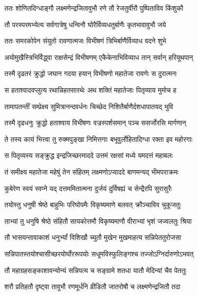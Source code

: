 \twolineshloka
{ततः शोणितदिग्धाङ्गौ लक्ष्मणेन्द्रजितावुभौ}
{रणे तौ रेजतुर्वीरौ पुष्पिताविव किंशुकौ} %

\twolineshloka
{तौ परस्परमभ्येत्य सर्वगात्रेषु धन्विनौ}
{घोरैर्विव्यधतुर्बाणैः कृतभावावुभौ जये} %

\twolineshloka
{ततः समरकोपेन संयुतो रावणात्मजः}
{विभीषणं त्रिभिर्बाणैर्विव्याध वदने शुभे} %

\twolineshloka
{अयोमुखैस्त्रिभिर्विद्ध्वा राक्षसेन्द्रं विभीषणम्}
{एकैकेनाभिविव्याध तान् सर्वान् हरियूथपान्} %

\twolineshloka
{तस्मै दृढतरं क्रुद्धो जघान गदया हयान्}
{विभीषणो महातेजा रावणेः स दुरात्मनः} %

\twolineshloka
{स हताश्वादवप्लुत्य रथान्निहतसारथेः}
{अथ शक्तिं महातेजाः पितृव्याय मुमोच ह} %

\twolineshloka
{तामापतन्तीं सम्प्रेक्ष्य सुमित्रानन्दवर्धनः}
{चिच्छेद निशितैर्बाणैर्दशधापातयद् भुवि} %

\twolineshloka
{तस्मै दृढधनुः क्रुद्धो हताश्वाय विभीषणः}
{वज्रस्पर्शसमान् पञ्च ससर्जोरसि मार्गणान्} %

\twolineshloka
{ते तस्य कायं भित्त्वा तु रुक्मपुङ्खा निमित्तगाः}
{बभूवुर्लोहितादिग्धा रक्ता इव महोरगाः} %

\twolineshloka
{स पितृव्यस्य सङ्क्रुद्ध इन्द्रजिच्छरमाददे}
{उत्तमं रक्षसां मध्ये यमदत्तं महाबलः} %

\twolineshloka
{तं समीक्ष्य महातेजा महेषुं तेन संहितम्}
{लक्ष्मणोऽप्याददे बाणमन्यद् भीमपराक्रमः} %

\twolineshloka
{कुबेरेण स्वयं स्वप्ने यद् दत्तममितात्मना}
{दुर्जयं दुर्विषह्यं च सेन्द्रैरपि सुरासुरैः} %

\twolineshloka
{तयोस्तु धनुषी श्रेष्ठे बाहुभिः परिघोपमैः}
{विकृष्यमाणे बलवत् क्रौञ्चाविव चुकूजतुः} %

\twolineshloka
{ताभ्यां तु धनुषि श्रेष्ठे संहितौ सायकोत्तमौ}
{विकृष्यमाणौ वीराभ्यां भृशं जज्वलतुः श्रिया} %

\twolineshloka
{तौ भासयन्तावाकाशं धनुर्भ्यां विशिखौ च्युतौ}
{मुखेन मुखमाहत्य सन्निपेततुरोजसा} %

\twolineshloka
{सन्निपातस्तयोश्चासीच्छरयोर्घोररूपयोः}
{सधूमविस्फुलिङ्गश्च तज्जोऽग्निर्दारुणोऽभवत्} %

\twolineshloka
{तौ महाग्रहसङ्काशावन्योन्यं सन्निपत्य च}
{सङ्ग्रामे शतधा यातौ मेदिन्यां चैव पेततुः} %

\twolineshloka
{शरौ प्रतिहतौ दृष्ट्वा तावुभौ रणमूर्धनि}
{व्रीडितौ जातरोषौ च लक्ष्मणेन्द्रजितौ तदा} %

